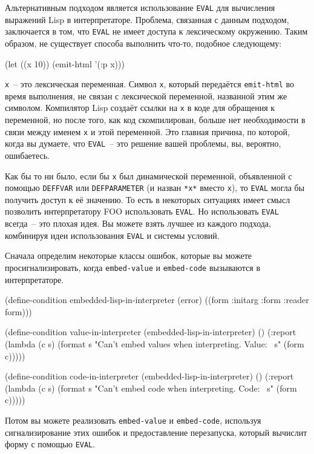 \small
Альтернативным подходом является использование \lstinline{EVAL} для вычисления
  выражений Lisp в интерпретаторе. Проблема, связанная с данным подходом, заключается в
  том, что \lstinline{EVAL} не имеет доступа к лексическому окружению. Таким образом, не
  существует способа выполнить что-то, подобное следующему:

\begin{myverb}
(let ((x 10)) (emit-html '(:p x)))
\end{myverb}

\noindent{}\lstinline!х!~-- это лексическая переменная. Символ \lstinline!х!, который передаётся
\lstinline!emit-html! во время выполнения, не связан с лексической переменной, названной
этим же символом.  Компилятор Lisp создаёт ссылки на \lstinline!х! в коде для обращения к
переменной, но после того, как код скомпилирован, больше нет необходимости в связи между
именем \lstinline!х! и этой переменной. Это главная причина, по которой, когда вы думаете,
что \lstinline!EVAL!~-- это решение вашей проблемы, вы, вероятно, ошибаетесь.

Как бы то ни было, если бы \lstinline{х} был динамической переменной, объявленной с помощью
\lstinline{DEFFVAR} или \lstinline{DEFPARAMETER} (и назван \lstinline{*х*} вместо \lstinline{х}), то
\lstinline{EVAL} могла бы получить доступ к её значению.  То есть в некоторых ситуациях имеет
смысл позволить интерпретатору FOO использовать \lstinline{EVAL}. Но использовать \lstinline{EVAL}
всегда~-- это плохая идея. Вы можете взять лучшее из каждого подхода, комбинируя идеи
использования \lstinline{EVAL} и системы условий.

Сначала определим некоторые классы ошибок, которые вы можете просигнализировать,
когда \lstinline{embed-value} и \lstinline{embed-code} вызываются в интерпретаторе.

\begin{myverb}
(define-condition embedded-lisp-in-interpreter (error)
  ((form :initarg :form :reader form)))

(define-condition value-in-interpreter (embedded-lisp-in-interpreter) ()
  (:report
   (lambda (c s) 
     (format s "Can't embed values when interpreting. Value: ~s" (form c)))))

(define-condition code-in-interpreter (embedded-lisp-in-interpreter) ()
  (:report
   (lambda (c s) 
     (format s "Can't embed code when interpreting. Code: ~s" (form c)))))
\end{myverb}

Потом вы можете реализовать \lstinline{embed-value} и \lstinline{embed-code}, используя
сигнализирование этих ошибок и предоставление перезапуска, который вычислит форму с
помощью \lstinline{EVAL}.

